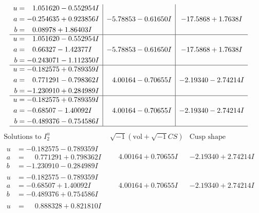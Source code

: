 \documentclass[1p]{elsarticle_modified}
\theoremstyle{definition}
\newcommand{\I}{\sqrt{-1}}
\begin{document}
$$\begin{array}{c|c|c}
\begin{aligned}
u &= \phantom{-}1.051620 - 0.552954 I \\
a &= -0.254635 + 0.923856 I \\
b &= \phantom{-}0.08978 + 1.86403 I\end{aligned}
 & -5.78853 - 0.61650 I & -17.5868 + 1.7638 I \\ \hline\begin{aligned}
u &= \phantom{-}1.051620 - 0.552954 I \\
a &= \phantom{-}0.66327 - 1.42377 I \\
b &= -0.243071 - 1.112350 I\end{aligned}
 & -5.78853 - 0.61650 I & -17.5868 + 1.7638 I \\ \hline\begin{aligned}
u &= -0.182575 + 0.789359 I \\
a &= \phantom{-}0.771291 - 0.798362 I \\
b &= -1.230910 + 0.284989 I\end{aligned}
 & \phantom{-}4.00164 - 0.70655 I & -2.19340 - 2.74214 I \\ \hline\begin{aligned}
u &= -0.182575 + 0.789359 I \\
a &= -0.68507 - 1.40092 I \\
b &= -0.489376 - 0.754586 I\end{aligned}
 & \phantom{-}4.00164 - 0.70655 I & -2.19340 - 2.74214 I\\
 \hline 
 \end{array}$$\newpage$$\begin{array}{c|c|c}  
\text{Solutions to }I^u_{2}& \I (\text{vol} + \sqrt{-1}CS) & \text{Cusp shape}\\
 \hline 
\begin{aligned}
u &= -0.182575 - 0.789359 I \\
a &= \phantom{-}0.771291 + 0.798362 I \\
b &= -1.230910 - 0.284989 I\end{aligned}
 & \phantom{-}4.00164 + 0.70655 I & -2.19340 + 2.74214 I \\ \hline\begin{aligned}
u &= -0.182575 - 0.789359 I \\
a &= -0.68507 + 1.40092 I \\
b &= -0.489376 + 0.754586 I\end{aligned}
 & \phantom{-}4.00164 + 0.70655 I & -2.19340 + 2.74214 I \\ \hline\begin{aligned}
u &= \phantom{-}0.888328 + 0.821810 I \\

\end{aligned}
\end{array}$$
\end{document}
